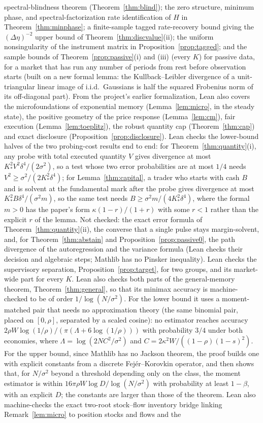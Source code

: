 \documentclass[12pt]{article}
\theoremstyle{definition}
\theoremstyle{remark}
\begin{document}
spectral-blindness theorem (Theorem~\ref{thm:blind}); the zero structure, minimum phase, and spectral-factorization rate identification of $H$ in Theorem~\ref{thm:minphase}; a finite-sample tagged rate-recovery bound giving the $(\Delta\eta)^{-2}$ upper bound of Theorem~\ref{thm:discvalue}(ii); the uniform nonsingularity of the instrument matrix in Proposition~\ref{prop:tagged}; and the sample bounds of Theorem~\ref{prop:passive}(i) and (iii) (every $K$) for passive data, for a market that has run any number of periods from rest before observation starts (built on a new formal lemma: the Kullback--Leibler divergence of a unit-triangular linear image of i.i.d.\ Gaussians is half the squared Frobenius norm of its off-diagonal part). From the project's earlier formalization, Lean also covers the microfoundations of exponential memory (Lemma~\ref{lem:micro}, in the steady state), the positive geometry of the price response (Lemma~\ref{lem:cm}), fair execution (Lemma~\ref{lem:toeplitz}), the robust quantity cap (Theorem~\ref{thm:cap}) and exact disclosure (Proposition~\ref{prop:disclosure}). Lean checks the lower-bound halves of the two probing-cost results end to end: for Theorem~\ref{thm:quantity}(i), any probe with total executed quantity $V$ gives divergence at most $K_*^2V^2\delta^4/(2\sigma^2)$, so a test whose two error probabilities are at most $1/4$ needs $V^2\ge\sigma^2/(2K_*^2\delta^4)$; for Lemma~\ref{thm:capital}, a trader who starts with cash $B$ and is solvent at the fundamental mark after the probe gives divergence at most $K_*^2B\delta^4/(\sigma^2m)$, so the same test needs $B\ge\sigma^2m/(4K_*^2\delta^4)$, where the formal $m>0$ has the paper's form $\kappa(1-r)/(1+r)$ with some $r<1$ rather than the explicit $r$ of the lemma. Not checked: the exact error formula of Theorem~\ref{thm:quantity}(ii), the converse that a single pulse stays margin-solvent, and, for Theorem~\ref{thm:abstain} and Proposition~\ref{prop:passive0}, the path divergence of the autoregression and the variance formula (Lean checks their decision and algebraic steps; Mathlib has no Pinsker inequality). Lean checks the supervisory separation, Proposition~\ref{prop:target}, for two groups, and its market-wide part for every $K$. Lean also checks both parts of the general-memory theorem, Theorem~\ref{thm:general}, so that its minimax accuracy is machine-checked to be of order $1/\log(N/\sigma^2)$. For the lower bound it uses a moment-matched pair that needs no approximation theory (the same binomial pair, placed on $[0,\rho]$, separated by a scaled cosine): no estimator reaches accuracy $2\rho W\log(1/\rho)/(\pi(\Lambda+6\log(1/\rho)))$ with probability $3/4$ under both economies, where $\Lambda=\log(2NC^2/\sigma^2)$ and $C=2\kappa^2W/((1-\rho)(1-s)^2)$. For the upper bound, since Mathlib has no Jackson theorem, the proof builds one with explicit constants from a discrete Fejér--Korovkin operator, and then shows that, for $N/\sigma^2$ beyond a threshold depending only on the class, the moment estimator is within $16\pi\rho W\log D/\log(N/\sigma^2)$ with probability at least $1-\beta$, with an explicit $D$; the constants are larger than those of the theorem. Lean also machine-checks the exact two-root stock--flow inventory bridge linking Remark~\ref{lem:micro} to position stocks and flows and the 
\end{document}
